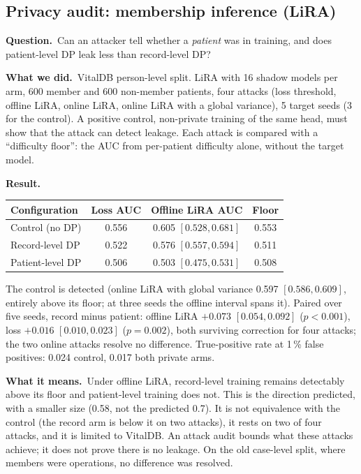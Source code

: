 \documentclass[11pt,a4paper]{article}
\newenvironment{experiment}[2]{\subsection{#1}\label{#2}}{}
\newcommand{\Q}{\par\textbf{Question.}\ }
\newcommand{\D}{\par\textbf{What we did.}\ }
\newcommand{\R}{\par\textbf{Result.}\ }
\newcommand{\M}{\par\textbf{What it means.}\ }
\begin{document}
\begin{experiment}{Privacy audit: membership inference (LiRA)}{exp:mia}
\Q Can an attacker tell whether a \emph{patient} was in training, and does
patient-level DP leak less than record-level DP?
\D VitalDB person-level split. LiRA with 16 shadow models per arm, 600 member
and 600 non-member patients, four attacks (loss threshold, offline LiRA, online
LiRA, online LiRA with a global variance), 5 target seeds (3 for the control).
A positive control, non-private training of the same head, must show that the
attack can detect leakage. Each attack is compared with a ``difficulty floor'':
the AUC from per-patient difficulty alone, without the target model.
\R
\begin{center}\small
\begin{tabular}{lccc}
\toprule
Configuration & Loss AUC & Offline LiRA AUC & Floor \\
\midrule
Control (no DP) & 0.556 & 0.605 $[0.528, 0.681]$ & 0.553 \\
Record-level DP & 0.522 & 0.576 $[0.557, 0.594]$ & 0.511 \\
Patient-level DP & 0.506 & 0.503 $[0.475, 0.531]$ & 0.508 \\
\bottomrule
\end{tabular}
\end{center}
The control is detected (online LiRA with global variance 0.597 $[0.586,
0.609]$, entirely above its floor; at three seeds the offline interval spans
it). Paired over five seeds, record minus patient: offline LiRA $+0.073$
$[0.054, 0.092]$ ($p < 0.001$), loss $+0.016$ $[0.010, 0.023]$ ($p = 0.002$),
both surviving correction for four attacks; the two online attacks resolve no
difference. True-positive rate at 1\,\% false positives: 0.024 control, 0.017
both private arms.
\M Under offline LiRA, record-level training remains detectably above its
floor and patient-level training does not. This is the direction predicted,
with a smaller size (0.58, not the predicted 0.7). It is not equivalence with
the control (the record arm is below it on two attacks), it rests on two of
four attacks, and it is limited to VitalDB. An attack audit bounds what these
attacks achieve; it does not prove there is no leakage. On the old case-level
split, where members were operations, no difference was resolved.
\end{experiment}
\end{document}
